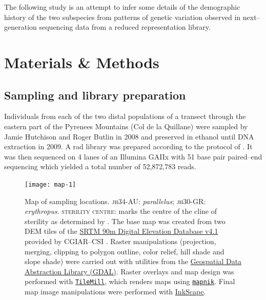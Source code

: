 \documentclass[a4paper,12pt,times,print,index,custombib,custommargin]{PhDThesisPSnPDF}\usepackage[]{graphicx}\usepackage[]{color}
\begin{document}
The following study is an attempt to infer some details of the demographic history of the two subspecies from patterns of genetic variation observed in next--generation sequencing data from a reduced representation library.

%
%
%
\section{Materials \& Methods}
%
%
%
%
%
\subsection{Sampling and library preparation}

Individuals from each of the two distal populations of a transect through the eastern part of the Pyrenees Mountains (Col de la Quillane) were sampled by Jamie Hutchison and Roger Butlin in 2008 and preserved in ethanol until DNA extraction in 2009. A \gls{rad} library was prepared according to the protocol of \cite{Baird2008}. It was then sequenced on 4 lanes of an Illumina GAIIx with 51 base pair paired--end sequencing which yielded a total number of 52,872,783 reads.
%
\begin{figure}[htb]
\centering
\texttt{[image: map-1]}
\caption{Map of sampling locations. \textsc{jh34-AU}: \textit{parallelus}; \textsc{jh30-GR}: \textit{erythropus}. \textsc{sterility centre}: marks the centre of the cline of sterility as determined by \cite{Shuker2005}. 
{\scriptsize The base map was created from two \gls{DEM} tiles  of the \href{http://www.cgiar-csi.org/data/srtm-90m-digital-elevation-database-v4-1}{SRTM 90m Digital Elevation Database v4.1} provided by CGIAR--CSI \citep{Jarvis2008}. Raster manipulations (projection, merging, clipping to polygon outline, color relief, hill shade and slope shade)  were carried out with utilities from the \href{www.gdal.org}{Geospatial Data Abstraction Library (GDAL)}. Raster overlays and map design was performed with \href{https://tilemill-project.github.io/tilemill/}{\texttt{TileMill}}, which renders maps using \href{http://mapnik.org/}{\texttt{mapnik}}. Final map image manipulations were performed with \href{https://inkscape.org/en/}{InkScape}.}
}
\label{Fig:sampling-sites-map}
\end{figure}
%

%
%
\end{document}
